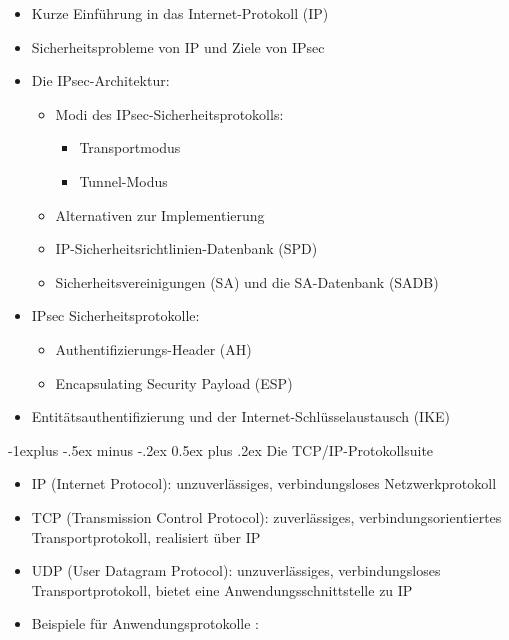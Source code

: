 \documentclass[a4paper]{article}
\makeatletter
\renewcommand{\subsection}{\@startsection{subsection}{2}{0mm}%
 {-1explus -.5ex minus -.2ex}%
 {0.5ex plus .2ex}%
 {\normalfont\normalsize\bfseries}}
\makeatother
\begin{document}
\begin{multicols}{3}
    \begin{itemize}
        \item
              Kurze Einführung in das Internet-Protokoll (IP)
        \item
              Sicherheitsprobleme von IP und Ziele von IPsec
        \item
              Die IPsec-Architektur:

              \begin{itemize}
                  \item
                        Modi des IPsec-Sicherheitsprotokolls:

                        \begin{itemize}
                            \item
                                  Transportmodus
                            \item
                                  Tunnel-Modus
                        \end{itemize}
                  \item
                        Alternativen zur Implementierung
                  \item
                        IP-Sicherheitsrichtlinien-Datenbank (SPD)
                  \item
                        Sicherheitsvereinigungen (SA) und die SA-Datenbank (SADB)
              \end{itemize}
        \item
              IPsec Sicherheitsprotokolle:

              \begin{itemize}
                  \item
                        Authentifizierungs-Header (AH)
                  \item
                        Encapsulating Security Payload (ESP)
              \end{itemize}
        \item
              Entitätsauthentifizierung und der Internet-Schlüsselaustausch (IKE)
    \end{itemize}


    \subsection{Die TCP/IP-Protokollsuite}

    \begin{itemize}
        \item
              IP (Internet Protocol): unzuverlässiges, verbindungsloses
              Netzwerkprotokoll
        \item
              TCP (Transmission Control Protocol): zuverlässiges,
              verbindungsorientiertes Transportprotokoll, realisiert über IP
        \item
              UDP (User Datagram Protocol): unzuverlässiges, verbindungsloses
              Transportprotokoll, bietet eine Anwendungsschnittstelle zu IP
        \item
              Beispiele für Anwendungsprotokolle :


\end{itemize}
\end{multicols}
\end{document}
